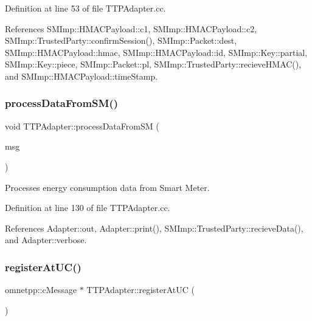 Definition at line 53 of file T\+T\+P\+Adapter.\+cc.



References S\+M\+Imp\+::\+H\+M\+A\+C\+Payload\+::c1, S\+M\+Imp\+::\+H\+M\+A\+C\+Payload\+::c2, S\+M\+Imp\+::\+Trusted\+Party\+::confirm\+Session(), S\+M\+Imp\+::\+Packet\+::dest, S\+M\+Imp\+::\+H\+M\+A\+C\+Payload\+::hmac, S\+M\+Imp\+::\+H\+M\+A\+C\+Payload\+::id, S\+M\+Imp\+::\+Key\+::partial, S\+M\+Imp\+::\+Key\+::piece, S\+M\+Imp\+::\+Packet\+::pl, S\+M\+Imp\+::\+Trusted\+Party\+::recieve\+H\+M\+A\+C(), and S\+M\+Imp\+::\+H\+M\+A\+C\+Payload\+::time\+Stamp.

\mbox{\label{classTTPAdapter_ab69604de63c3f769a10ec33168611274}} 
\subsubsection{\texorpdfstring{process\+Data\+From\+S\+M()}{processDataFromSM()}}
{\footnotesize\ttfamily void T\+T\+P\+Adapter\+::process\+Data\+From\+SM (\begin{DoxyParamCaption}\item[{omnetpp\+::c\+Message $\ast$}]{msg }\end{DoxyParamCaption})}

Processes energy consumption data from Smart Meter. 

Definition at line 130 of file T\+T\+P\+Adapter.\+cc.



References Adapter\+::out, Adapter\+::print(), S\+M\+Imp\+::\+Trusted\+Party\+::recieve\+Data(), and Adapter\+::verbose.

\mbox{\label{classTTPAdapter_a4eba454018be25436474c37ae1bbe083}} 
\subsubsection{\texorpdfstring{register\+At\+U\+C()}{registerAtUC()}}
{\footnotesize\ttfamily omnetpp\+::c\+Message $\ast$ T\+T\+P\+Adapter\+::register\+At\+UC (\begin{DoxyParamCaption}{ }\end{DoxyParamCaption})}

